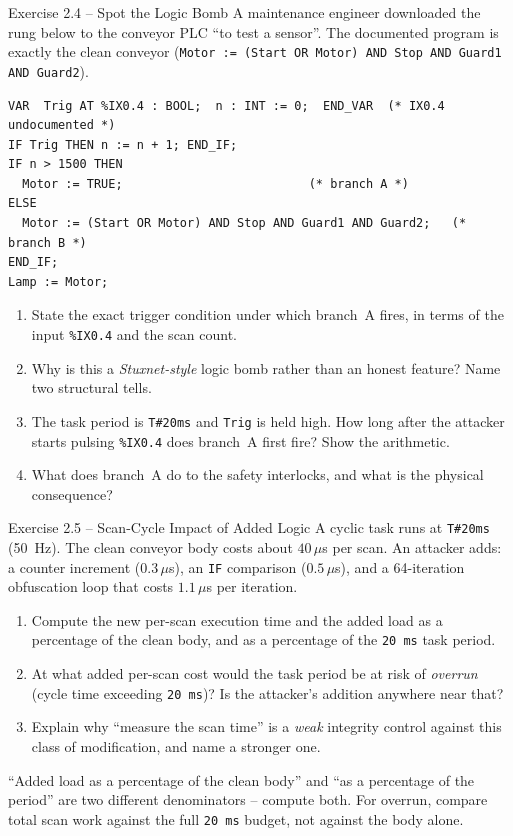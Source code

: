 \documentclass[11pt,a4paper]{article}
\begin{document}
\begin{taskbox}{Exercise 2.4 -- Spot the Logic Bomb}
A maintenance engineer downloaded the rung below to the conveyor PLC ``to test a sensor''. The
documented program is exactly the clean conveyor (\texttt{Motor := (Start OR Motor) AND Stop AND
Guard1 AND Guard2}).
\begin{lstlisting}
VAR  Trig AT %IX0.4 : BOOL;  n : INT := 0;  END_VAR  (* IX0.4 undocumented *)
IF Trig THEN n := n + 1; END_IF;
IF n > 1500 THEN
  Motor := TRUE;                          (* branch A *)
ELSE
  Motor := (Start OR Motor) AND Stop AND Guard1 AND Guard2;   (* branch B *)
END_IF;
Lamp := Motor;
\end{lstlisting}
\begin{enumerate}\setlength{\itemsep}{0pt}
  \item State the exact trigger condition under which branch~A fires, in terms of the input
        \texttt{\%IX0.4} and the scan count.
  \item Why is this a \emph{Stuxnet-style} logic bomb rather than an honest feature? Name two
        structural tells.
  \item The task period is \texttt{T\#20ms} and \texttt{Trig} is held high. How long after the
        attacker starts pulsing \texttt{\%IX0.4} does branch~A first fire? Show the arithmetic.
  \item What does branch~A do to the safety interlocks, and what is the physical consequence?
\end{enumerate}
\end{taskbox}

\begin{taskbox}{Exercise 2.5 -- Scan-Cycle Impact of Added Logic}
A cyclic task runs at \texttt{T\#20ms} (50~Hz). The clean conveyor body costs about
$40\,\mu$s per scan. An attacker adds: a counter increment ($0.3\,\mu$s),
an \texttt{IF} comparison ($0.5\,\mu$s), and a 64-iteration obfuscation loop that
costs $1.1\,\mu$s per iteration.
\begin{enumerate}\setlength{\itemsep}{0pt}
  \item Compute the new per-scan execution time and the added load as a percentage of the clean
        body, and as a percentage of the \texttt{20\,ms} task period.
  \item At what added per-scan cost would the task period be at risk of \emph{overrun} (cycle
        time exceeding \texttt{20\,ms})? Is the attacker's addition anywhere near that?
  \item Explain why ``measure the scan time'' is a \emph{weak} integrity control against this
        class of modification, and name a stronger one.
\end{enumerate}
\begin{hintbox}
``Added load as a percentage of the clean body'' and ``as a percentage of the period'' are two
different denominators -- compute both. For overrun, compare total scan work against the full
\texttt{20\,ms} budget, not against the body alone.
\end{hintbox}
\end{taskbox}
\end{document}
